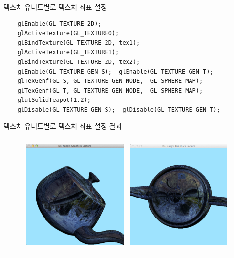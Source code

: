 \documentclass{beamer}
\begin{document}
\begin{frame}[fragile]{텍스처 유니트별로 텍스처 좌표 설정}

\lstset{language=C++, escapechar=^} 
\begin{lstlisting}
    glEnable(GL_TEXTURE_2D);
    glActiveTexture(GL_TEXTURE0);
    glBindTexture(GL_TEXTURE_2D, tex1);
    glActiveTexture(GL_TEXTURE1);
    glBindTexture(GL_TEXTURE_2D, tex2);
    glEnable(GL_TEXTURE_GEN_S);  glEnable(GL_TEXTURE_GEN_T);
    glTexGenf(GL_S, GL_TEXTURE_GEN_MODE,  GL_SPHERE_MAP);
    glTexGenf(GL_T, GL_TEXTURE_GEN_MODE,  GL_SPHERE_MAP);
    glutSolidTeapot(1.2);
    glDisable(GL_TEXTURE_GEN_S);  glDisable(GL_TEXTURE_GEN_T);
\end{lstlisting}

\end{frame}

\begin{frame}[fragile]{텍스처 유니트별로 텍스처 좌표 설정 결과}

\begin{figure}[h!]
  \centering
	\begin{tabular}{cc}
	\includegraphics[height=6cm]{OGL_texture/multiTexturedA.png} &
	\includegraphics[height=6cm]{OGL_texture/multiTexturedB.png}  \\
	\end{tabular}
\end{figure}

\end{frame}
\end{document}

